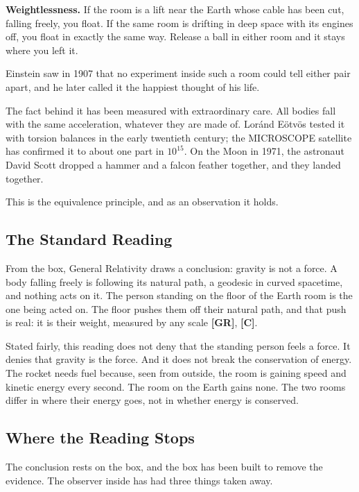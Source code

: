 \documentclass[11pt,a4paper]{article}
\newcommand{\reg}[1]{\textsf{\small\textbf{[#1]}}}
\newcommand{\RGR}{\reg{GR}}
\newcommand{\RC}{\reg{C}}
\begin{document}
\textbf{Weightlessness.} If the room is a lift near the Earth whose cable has been cut, falling freely, you float. If the same room is drifting in deep space with its engines off, you float in exactly the same way. Release a ball in either room and it stays where you left it.

Einstein saw in 1907 that no experiment inside such a room could tell either pair apart, and he later called it the happiest thought of his life.

The fact behind it has been measured with extraordinary care. All bodies fall with the same acceleration, whatever they are made of. Lor\'and E\"otv\"os tested it with torsion balances in the early twentieth century; the MICROSCOPE satellite has confirmed it to about one part in $10^{15}$. On the Moon in 1971, the astronaut David Scott dropped a hammer and a falcon feather together, and they landed together.

This is the equivalence principle, and as an observation it holds.

\subsection*{The Standard Reading}

From the box, General Relativity draws a conclusion: gravity is not a force. A body falling freely is following its natural path, a geodesic in curved spacetime, and nothing acts on it. The person standing on the floor of the Earth room is the one being acted on. The floor pushes them off their natural path, and that push is real: it is their weight, measured by any scale \RGR{}, \RC{}.

Stated fairly, this reading does not deny that the standing person feels a force. It denies that gravity is the force. And it does not break the conservation of energy. The rocket needs fuel because, seen from outside, the room is gaining speed and kinetic energy every second. The room on the Earth gains none. The two rooms differ in where their energy goes, not in whether energy is conserved.

\subsection*{Where the Reading Stops}

The conclusion rests on the box, and the box has been built to remove the evidence. The observer inside has had three things taken away.
\end{document}
